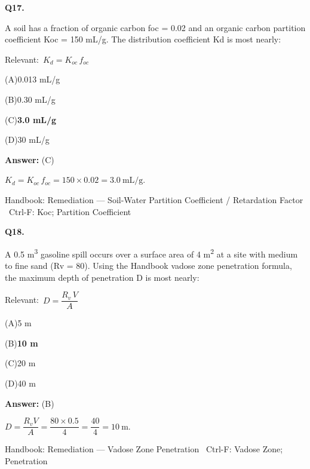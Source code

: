 \documentclass[11pt]{article}
\newcommand{\correct}[1]{\textbf{#1}\;{\color{accent}$\checkmark$}}
\newcommand{\optline}[2]{\par\noindent\hspace{1.2em}(#1)\hspace{0.6em}#2}
\begin{document}
\vspace{9pt}
\filbreak
\textbf{\color{accent}Q17.}\par\vspace{2pt}
A soil has a fraction of organic carbon foc = 0.02 and an organic carbon partition coefficient Koc = 150 mL/g. The distribution coefficient Kd is most nearly:\par\vspace{3pt}
{\small\color{soft}Relevant:}\ $K_d = K_{oc}\,f_{oc}$\par\vspace{3pt}
\optline{A}{0.013 mL/g}
\optline{B}{0.30 mL/g}
\optline{C}{\correct{3.0 mL/g}}
\optline{D}{30 mL/g}
\par\vspace{3pt}
\vspace{2pt}\par\noindent\colorbox{boxbg}{\parbox{\dimexpr\linewidth-2\fboxsep\relax}{%
\vspace{2pt}\textbf{Answer:} (C)\par\vspace{2pt}
{\small $K_d = K_{oc}\,f_{oc} = 150\times0.02 = 3.0\ \mathrm{mL/g}$.}\par\vspace{2pt}
{\footnotesize\color{soft}Handbook: Remediation --- Soil-Water Partition Coefficient / Retardation Factor \textbullet\ Ctrl-F: Koc; Partition Coefficient}\vspace{2pt}
}}
\vspace{9pt}
\filbreak
\textbf{\color{accent}Q18.}\par\vspace{2pt}
A 0.5 m\textsuperscript{3} gasoline spill occurs over a surface area of 4 m\textsuperscript{2} at a site with medium to fine sand (Rv = 80). Using the Handbook vadose zone penetration formula, the maximum depth of penetration D is most nearly:\par\vspace{3pt}
{\small\color{soft}Relevant:}\ $D = \dfrac{R_v\,V}{A}$\par\vspace{3pt}
\optline{A}{5 m}
\optline{B}{\correct{10 m}}
\optline{C}{20 m}
\optline{D}{40 m}
\par\vspace{3pt}
\vspace{2pt}\par\noindent\colorbox{boxbg}{\parbox{\dimexpr\linewidth-2\fboxsep\relax}{%
\vspace{2pt}\textbf{Answer:} (B)\par\vspace{2pt}
{\small $D = \dfrac{R_v V}{A} = \dfrac{80\times0.5}{4} = \dfrac{40}{4} = 10\ \mathrm{m}$.}\par\vspace{2pt}
{\footnotesize\color{soft}Handbook: Remediation --- Vadose Zone Penetration \textbullet\ Ctrl-F: Vadose Zone; Penetration}\vspace{2pt}
}}
\end{document}
